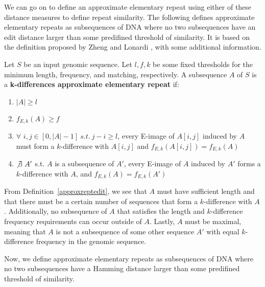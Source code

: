 \begin{notate}
\begin{itemize}
\end{itemize}
\end{notate}

We can go on to define an approximate elementary repeat using either of these distance measures to define repeat similarity. The following defines approximate elementary repeats as subsequences of DNA where no two subsequences have an edit distance larger than some predifined threshold of similarity. It is based on the definition proposed by Zheng and Lonardi \cite{zheng2005discovery}, with some additional information.

\begin{defn}
Let $S$ be an input genomic sequence. Let $l, f, k$ be some fixed thresholds for the minimum length, frequency, and matching, respectively. A subsequence $A$ of $S$ is a \textbf{k-differences approximate elementary repeat} if:
\begin{enumerate}
\item{$|A| \geq l$} %
\item{$f_{E,k}(A) \geq f$}
\item{$\forall$ $i, j \in [0,|A|-1] \ s.t. \ j-i \geq l$, every E-image of $A[i,j]$ induced by $A$ must form a $k$-difference with $A[i,j]$ and $f_{E,k}(A[i,j]) = f_{E,k}(A)$}
\item{$\not\exists \ A'$  s.t. $A$ is a subsequence of $A'$, every E-image of $A$ induced by $A'$ forms a $k$-difference with $A$, and $f_{E,k}(A) = f_{E,k}(A')$}
\end{enumerate}
\label{approxreptedit}
\end{defn}

From Definition~\ref{approxreptedit}, we see that $A$ must have sufficient length and that there must be a certain number of sequences that form a $k$-difference with $A$. Additionally, no subsequence of $A$ that satisfies the length and $k$-difference frequency requirements can occur outside of $A$. Lastly, $A$ must be maximal, meaning that $A$ is not a subsequence of some other sequence $A'$ with equal $k$-difference frequency in the genomic sequence.


Now, we define approximate elementary repeats as subsequences of DNA where no two subsequences have a Hamming distance larger than some predifined threshold of similarity. 

